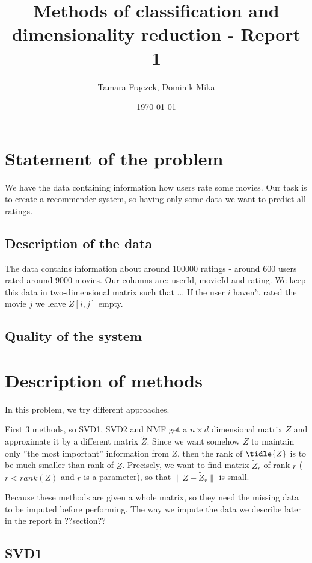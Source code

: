 \documentclass[11pt]{amsart}
\author{Tamara Frączek, Dominik Mika}
\title{Methods of classification and dimensionality reduction - Report 1}
\date{\today}
\begin{document}
\maketitle



\section{Statement of the problem}

We have the data containing information how users rate some movies.
Our task is to create a recommender system, so having only some data we want to predict all ratings.

\subsection{Description of the data}

The data contains information about around 100000 ratings - around 600 users rated around 9000 movies.
Our columns are: \textsf{userId}, \textsf{movieId} and \textsf{rating}.
We keep this data in two-dimensional matrix such that ...
If the user $i$ haven't rated the movie $j$ we leave $Z[i,j]$ empty.

\subsection{Quality of the system}


\section{Description of methods}

In this problem, we try different approaches.

First 3 methods, so SVD1, SVD2 and NMF get a $n \times d$ dimensional matrix $Z$ and approximate it by a different matrix $\tilde{Z}$.
Since we want somehow $\tilde{Z}$ to maintain only ''the most important'' information from $Z$, then the rank of $\tidle{Z}$ is to be much smaller than rank of $Z$.
Precisely, we want to find matrix $\tilde{Z}_r$ of rank $r$ ($r < rank(Z)$ and $r$ is a parameter), so that $\|Z - \tilde{Z}_r\|$ is small.

Because these methods are given a whole matrix, so they need the missing data to be imputed before performing.
The way we impute the data we describe later in the report in ??section??

\subsection*{SVD1}
\end{document}
